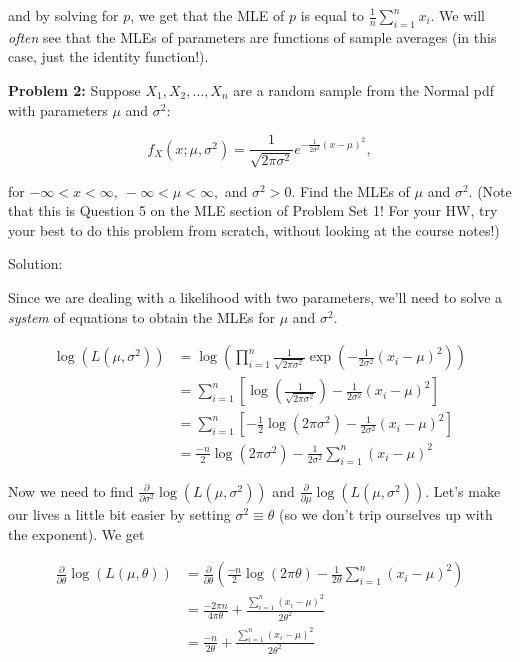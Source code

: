 \documentclass[
  letterpaper,
  DIV=11,
  numbers=noendperiod]{scrreprt}
\begin{document}
and by solving for \(p\), we get that the MLE of \(p\) is equal to
\(\frac{1}{n}\sum_{i = 1}^n x_i\). We will \emph{often} see that the
MLEs of parameters are functions of sample averages (in this case, just
the identity function!).

\textbf{Problem 2:} Suppose \(X_1, X_2, \dots, X_n\) are a random sample
from the Normal pdf with parameters \(\mu\) and \(\sigma^2\):

\[
f_X(x ; \mu, \sigma^2) = \frac{1}{\sqrt{2\pi\sigma^2}}e^{-\frac{1}{2\sigma^2}(x-\mu)^2},
\]

for \(-\infty < x < \infty, \ -\infty < \mu < \infty,\) and
\(\sigma^2 > 0\). Find the MLEs of \(\mu\) and \(\sigma^2\). (Note that
this is Question 5 on the MLE section of Problem Set 1! For your HW, try
your best to do this problem from scratch, without looking at the course
notes!)

Solution:

Since we are dealing with a likelihood with two parameters, we'll need
to solve a \emph{system} of equations to obtain the MLEs for \(\mu\) and
\(\sigma^2\).

\begin{align*}
    \log(L(\mu, \sigma^2)) & = \log( \prod_{i = 1}^n \frac{1}{\sqrt{2\pi\sigma^2}} \exp(-\frac{1}{2\sigma^2} (x_i - \mu)^2) ) \\
    & = \sum_{i = 1}^n \left[ \log(\frac{1}{\sqrt{2\pi \sigma^2}})  - \frac{1}{2\sigma^2} (x_i - \mu)^2 \right] \\
    & = \sum_{i = 1}^n \left[ -\frac{1}{2} \log(2 \pi \sigma^2) - \frac{1}{2\sigma^2} (x_i - \mu)^2 \right] \\
    & = \frac{-n}{2} \log(2\pi \sigma^2) - \frac{1}{2\sigma^2} \sum_{i = 1}^n (x_i - \mu)^2
\end{align*}

Now we need to find
\(\frac{\partial}{\partial \sigma^2}\log(L(\mu, \sigma^2))\) and
\(\frac{\partial}{\partial \mu}\log(L(\mu, \sigma^2))\). Let's make our
lives a little bit easier by setting \(\sigma^2 \equiv \theta\) (so we
don't trip ourselves up with the exponent). We get

\begin{align*}
    \frac{\partial}{\partial \theta}\log(L(\mu, \theta)) & = \frac{\partial}{\partial \theta} \left(\frac{-n}{2} \log(2\pi \theta) - \frac{1}{2\theta} \sum_{i = 1}^n (x_i - \mu)^2 \right)\\
    & = \frac{-2\pi n}{4 \pi \theta} + \frac{\sum_{i = 1}^n (x_i - \mu)^2 }{2 \theta^2} \\
    & = \frac{-n}{2 \theta} + \frac{\sum_{i = 1}^n (x_i - \mu)^2 }{2 \theta^2}
\end{align*}
\end{document}
